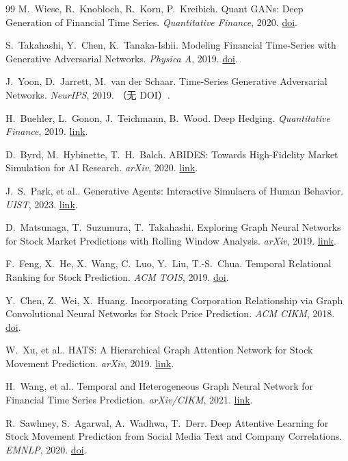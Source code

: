 \begin{thebibliography}{99}
 M.~Wiese, R.~Knobloch, R.~Korn, P.~Kreibich. Quant GANs: Deep Generation of Financial Time Series. \emph{Quantitative Finance}, 2020. \href{https://doi.org/10.1080/14697688.2020.1730426}{doi}.

 S.~Takahashi, Y.~Chen, K.~Tanaka-Ishii. Modeling Financial Time-Series with Generative Adversarial Networks. \emph{Physica A}, 2019. \href{https://doi.org/10.1016/j.physa.2019.121261}{doi}.

 J.~Yoon, D.~Jarrett, M.~van der Schaar. Time-Series Generative Adversarial Networks. \emph{NeurIPS}, 2019. （无 DOI）.

 H.~Buehler, L.~Gonon, J.~Teichmann, B.~Wood. Deep Hedging. \emph{Quantitative Finance}, 2019. \href{https://arxiv.org/abs/1802.03042}{link}.

 D.~Byrd, M.~Hybinette, T.~H.~Balch. ABIDES: Towards High-Fidelity Market Simulation for AI Research. \emph{arXiv}, 2020. \href{https://arxiv.org/abs/1904.12066}{link}.

 J.~S.~Park, et al.. Generative Agents: Interactive Simulacra of Human Behavior. \emph{UIST}, 2023. \href{https://arxiv.org/abs/2304.03442}{link}.

 D.~Matsunaga, T.~Suzumura, T.~Takahashi. Exploring Graph Neural Networks for Stock Market Predictions with Rolling Window Analysis. \emph{arXiv}, 2019. \href{https://arxiv.org/abs/1909.10660}{link}.

 F.~Feng, X.~He, X.~Wang, C.~Luo, Y.~Liu, T.-S.~Chua. Temporal Relational Ranking for Stock Prediction. \emph{ACM TOIS}, 2019. \href{https://doi.org/10.1145/3309547}{doi}.

 Y.~Chen, Z.~Wei, X.~Huang. Incorporating Corporation Relationship via Graph Convolutional Neural Networks for Stock Price Prediction. \emph{ACM CIKM}, 2018. \href{https://doi.org/10.1145/3269206.3269269}{doi}.

 W.~Xu, et al.. HATS: A Hierarchical Graph Attention Network for Stock Movement Prediction. \emph{arXiv}, 2019. \href{https://arxiv.org/abs/1908.07999}{link}.

 H.~Wang, et al.. Temporal and Heterogeneous Graph Neural Network for Financial Time Series Prediction. \emph{arXiv/CIKM}, 2021. \href{https://arxiv.org/abs/2305.08740}{link}.

 R.~Sawhney, S.~Agarwal, A.~Wadhwa, T.~Derr. Deep Attentive Learning for Stock Movement Prediction from Social Media Text and Company Correlations. \emph{EMNLP}, 2020. \href{https://doi.org/10.18653/v1/2020.emnlp-main.676}{doi}.


\end{thebibliography}
